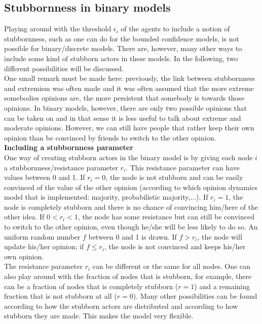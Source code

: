 \documentclass[11 pt , letterpaper , twoside , openright]{book}
\begin{document}
\subsection{Stubbornness in binary models}
\label{stubbBin}

Playing around with the threshold $\epsilon_i$ of the agents to include a notion of stubbornness, such as one can do for the bounded confidence models, is not possible for binary/discrete models. There are, however, many other ways to include some kind of stubborn actors in these models. In the following, two different possibilities will be discussed. \\
\newline
One small remark must be made here: previously, the link between stubbornness and extremism was often made and it was often assumed that the more extreme somebodies opinions are, the more persistent that somebody is towards those opinions. In binary models, however, there are only two possible opinions that can be taken on and in that sense it is less useful to talk about extreme and moderate opinions. However, we can still have people that rather keep their own opinion than be convinced by friends to switch to the other opinion.\\
\newline
\textbf{Including a stubbornness parameter}\\
\newline
One way of creating stubborn actors in the binary model is by giving each node $i$ a stubbornness/resistance parameter $r_i$. This resistance parameter can have values between 0 and 1. If $r_i = 0$, the node is not stubborn and can be easily convinced of the value of the other opinion (according to which opinion dynamics model that is implemented: majority, probabilistic majority,...). If $r_i = 1$, the node is completely stubborn and there is no chance of convincing him/here of the other idea. If $0 < r_i < 1$, the node has some resistance but can still be convinced to switch to the other opinion, even though he/she will be less likely to do so. An uniform random number $f$ between 0 and 1 is drawn. If $f > r_i$, the node will update his/her opinion; if $f \leqslant r_i$, the node is not convinced and keeps his/her own opinion.\\
\newline
The resistance parameter $r_i$ can be different or the same for all nodes. One can also play around with the fraction of nodes that is stubborn, for example, there can be a fraction of nodes that is completely stubborn ($r = 1$) and a remaining fraction that is not stubborn at all ($r = 0$). Many other possibilities can be found according to how the stubborn actors are distributed and according to how stubborn they are made. This makes the model very flexible.\\
\end{document}
